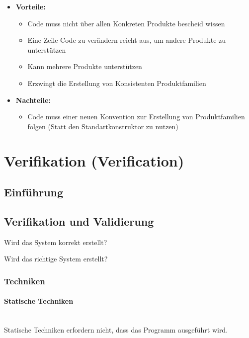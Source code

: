 \documentclass[ngerman,color=3b]{tuda_summary}
\begin{document}
\begin{itemize}
    \item \textbf{Vorteile:}\begin{itemize}
              \item Code muss nicht über allen Konkreten Produkte bescheid wissen
              \item Eine Zeile Code zu verändern reicht aus, um andere Produkte zu unterstützen
              \item Kann mehrere Produkte unterstützen
              \item Erzwingt die Erstellung von Konsistenten Produktfamilien
          \end{itemize}
    \item \textbf{Nachteile:}\begin{itemize}
              \item Code muss einer neuen Konvention zur Erstellung von Produktfamilien folgen (Statt den Standartkonstruktor zu nutzen)
          \end{itemize}
\end{itemize}

\clearpage
\section{Verifikation (Verification)}
\subsection{Einführung}

\subsection{Verifikation und Validierung}
\begin{definition}[Verifikation]
    Wird das System korrekt erstellt?
\end{definition}
\begin{definition}[Validierung]
    Wird das richtige System erstellt?
\end{definition}

\subsubsection{Techniken}
\paragraph{Statische Techniken}\mbox{}\\
Statische Techniken erfordern nicht, dass das Programm ausgeführt wird.
\end{document}
